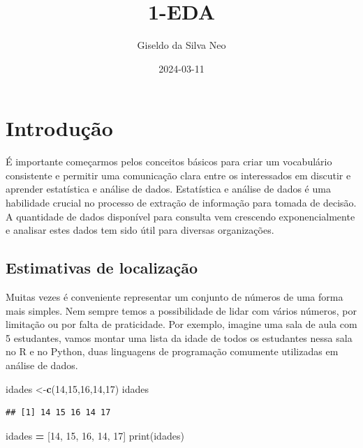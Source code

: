 \documentclass[
]{book}
\title{1-EDA}
\author{Giseldo da Silva Neo}
\date{2024-03-11}
\newenvironment{Shaded}{\begin{snugshade}}{\end{snugshade}}
\newcommand{\BuiltInTok}[1]{#1}
\newcommand{\DecValTok}[1]{\textcolor[rgb]{0.00,0.00,0.81}{#1}}
\newcommand{\FunctionTok}[1]{\textcolor[rgb]{0.13,0.29,0.53}{\textbf{#1}}}
\newcommand{\NormalTok}[1]{#1}
\newcommand{\OperatorTok}[1]{\textcolor[rgb]{0.81,0.36,0.00}{\textbf{#1}}}
\newcommand{\OtherTok}[1]{\textcolor[rgb]{0.56,0.35,0.01}{#1}}
\begin{document}
\maketitle

{
\setcounter{tocdepth}{1}
\tableofcontents
}
\hypertarget{introduuxe7uxe3o}{%
\chapter{Introdução}\label{introduuxe7uxe3o}}

É importante começarmos pelos conceitos básicos para criar um vocabulário consistente e permitir uma comunicação clara entre os interessados em discutir e aprender estatística e análise de dados. Estatística e análise de dados é uma habilidade crucial no processo de extração de informação para tomada de decisão. A quantidade de dados disponível para consulta vem crescendo exponencialmente e analisar estes dados tem sido útil para diversas organizações.

\hypertarget{estimativas-de-localizauxe7uxe3o}{%
\section{Estimativas de localização}\label{estimativas-de-localizauxe7uxe3o}}

Muitas vezes é conveniente representar um conjunto de números de uma forma mais simples. Nem sempre temos a possibilidade de lidar com vários números, por limitação ou por falta de praticidade. Por exemplo, imagine uma sala de aula com 5 estudantes, vamos montar uma lista da idade de todos os estudantes nessa sala no R e no Python, duas linguagens de programação comumente utilizadas em análise de dados.

\begin{Shaded}
\begin{Highlighting}[]
\NormalTok{idades }\OtherTok{\textless{}{-}}\FunctionTok{c}\NormalTok{(}\DecValTok{14}\NormalTok{,}\DecValTok{15}\NormalTok{,}\DecValTok{16}\NormalTok{,}\DecValTok{14}\NormalTok{,}\DecValTok{17}\NormalTok{)}
\NormalTok{idades}
\end{Highlighting}
\end{Shaded}

\begin{verbatim}
## [1] 14 15 16 14 17
\end{verbatim}

\begin{Shaded}
\begin{Highlighting}[]
\NormalTok{idades }\OperatorTok{=}\NormalTok{ [}\DecValTok{14}\NormalTok{, }\DecValTok{15}\NormalTok{, }\DecValTok{16}\NormalTok{, }\DecValTok{14}\NormalTok{, }\DecValTok{17}\NormalTok{]}
\BuiltInTok{print}\NormalTok{(idades)}
\end{Highlighting}
\end{Shaded}
\end{document}
